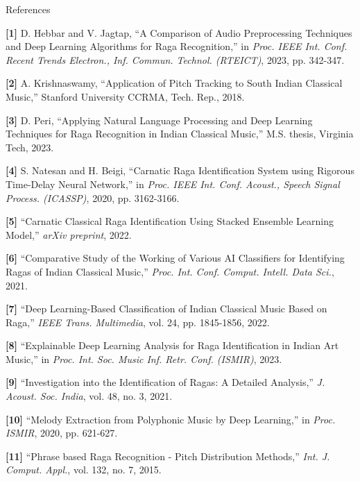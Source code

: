 \documentclass[aspectratio=169,11pt]{beamer}
\begin{document}
	\begin{frame}[allowframebreaks]{References}
		\tiny
		
		\textbf{[1]} D. Hebbar and V. Jagtap, ``A Comparison of Audio Preprocessing Techniques and Deep Learning Algorithms for Raga Recognition,'' in \textit{Proc. IEEE Int. Conf. Recent Trends Electron., Inf. Commun. Technol. (RTEICT)}, 2023, pp. 342-347.
		
		\textbf{[2]} A. Krishnaswamy, ``Application of Pitch Tracking to South Indian Classical Music,'' Stanford University CCRMA, Tech. Rep., 2018.
		
		\textbf{[3]} D. Peri, ``Applying Natural Language Processing and Deep Learning Techniques for Raga Recognition in Indian Classical Music,'' M.S. thesis, Virginia Tech, 2023.
		
		\textbf{[4]} S. Natesan and H. Beigi, ``Carnatic Raga Identification System using Rigorous Time-Delay Neural Network,'' in \textit{Proc. IEEE Int. Conf. Acoust., Speech Signal Process. (ICASSP)}, 2020, pp. 3162-3166.
		
		\textbf{[5]} ``Carnatic Classical Raga Identification Using Stacked Ensemble Learning Model,'' \textit{arXiv preprint}, 2022.
		
		\textbf{[6]} ``Comparative Study of the Working of Various AI Classifiers for Identifying Ragas of Indian Classical Music,'' \textit{Proc. Int. Conf. Comput. Intell. Data Sci.}, 2021.
		
		\textbf{[7]} ``Deep Learning-Based Classification of Indian Classical Music Based on Raga,'' \textit{IEEE Trans. Multimedia}, vol. 24, pp. 1845-1856, 2022.
		
		\textbf{[8]} ``Explainable Deep Learning Analysis for Raga Identification in Indian Art Music,'' in \textit{Proc. Int. Soc. Music Inf. Retr. Conf. (ISMIR)}, 2023.
		
		\framebreak
		
		\textbf{[9]} ``Investigation into the Identification of Ragas: A Detailed Analysis,'' \textit{J. Acoust. Soc. India}, vol. 48, no. 3, 2021.
		
		\textbf{[10]} ``Melody Extraction from Polyphonic Music by Deep Learning,'' in \textit{Proc. ISMIR}, 2020, pp. 621-627.
		
		\textbf{[11]} ``Phrase based Raga Recognition - Pitch Distribution Methods,'' \textit{Int. J. Comput. Appl.}, vol. 132, no. 7, 2015.
		

\end{frame}
\end{document}
